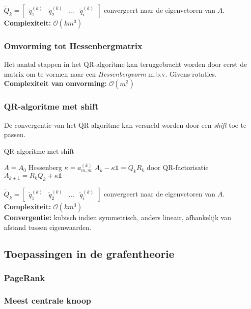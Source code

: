 \documentclass{article}
\begin{document}
	$\tilde{Q}_k = 
	\begin{bmatrix}
		\tilde{q}_1^{(k)} & \tilde{q}_2^{(k)} & ... & \tilde{q}_i^{(k)}
	\end{bmatrix}$ convergeert naar de eigenvctoren van $A$.\\
	
	
	\textbf{Complexiteit:} $\mathcal{O}(km^3)$
	
	\subsubsection{Omvorming tot Hessenbergmatrix}
	
	Het aantal stappen in het QR-algoritme kan teruggebracht worden door eerst de matrix om te vormen naar een \textit{Hessenbergvorm} m.b.v. Givens-rotaties.\\
		
	\textbf{Complexiteit van omvorming:} $\mathcal{O}(m^3)$
	
	\subsubsection{QR-algoritme met shift}
	
	De convergentie van het QR-algoritme kan versneld worden door een \textit{shift} toe te passen.
	
	\pagebreak
	
	\begin{algorithm}[!ht]
		\caption{QR-algoritme met shift}
		\begin{algorithmic}[1]
				\State $A=A_0$ Hessenberg
					\State $\kappa = a_{m,m}^{(k)}$
					\State $A_k - \kappa \mathbb{1} = Q_k R_k$ door QR-factorisatie
					\State $A_{k+1} = R_k Q_k + \kappa \mathbb{1}$
				\EndFor
			\EndProcedure
		\end{algorithmic}
	\end{algorithm}	
	$\tilde{Q}_k = 
	\begin{bmatrix}
	\tilde{q}_1^{(k)} & \tilde{q}_2^{(k)} & ... & \tilde{q}_i^{(k)}
	\end{bmatrix}$ convergeert naar de eigenvctoren van $A$.\\
	
	
	\textbf{Complexiteit:} $\mathcal{O}(km^3)$ \\
	\textbf{Convergentie:} kubisch indien symmetrisch, anders lineair, afhankelijk van afstand tussen eigenwaarden.
	
	\subsection{Toepassingen in de grafentheorie}
	
	\subsubsection{PageRank}
	
	\subsubsection{Meest centrale knoop}
	
\end{document}
